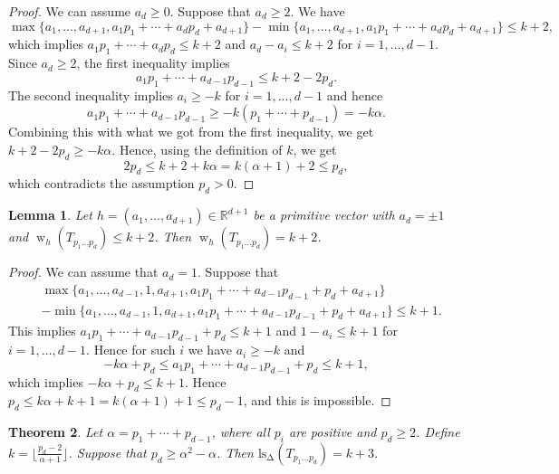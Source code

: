 \documentclass[11pt]{amsart}
\numberwithin{equation}{section}
\theoremstyle{plain}
\newtheorem{Theorem}{Theorem}[section]
\newtheorem{Lemma}[Theorem]{Lemma}
\theoremstyle{definition}
\newcommand{\R}{\mathbb R}
\newcommand{\w}{\operatorname{w}}
\newcommand{\ls}{\operatorname{ls_\Delta}}
\begin{document}
\begin{proof} We can assume $a_d\geq 0$. Suppose that $a_d\geq 2$. We have
$$\max\{a_1,\dots,a_{d+1},a_1p_1+\cdots +a_dp_d+a_{d+1}\}-\min\{a_1,\dots,a_{d+1},a_1p_1+\cdots +a_dp_d+a_{d+1}\}\leq k+2,
$$
which implies $a_1p_1+\cdots +a_dp_d\le k+2$
and $a_d-a_i\leq k+2$ for $i=1,\dots,d-1$.
Since $a_d\geq 2$, the first inequality  implies
$$a_1p_1+\cdots +a_{d-1}p_{d-1}\leq k+2-2p_d.
$$
The second inequality implies $a_i\geq -k$ for $i=1,\dots,d-1$ and  hence
$$a_1p_1+\cdots +a_{d-1}p_{d-1}\geq -k(p_1+\cdots+p_{d-1})=-k\alpha.
$$
Combining this with what we got from the first inequality, we get
$k+2-2p_d\geq -k\alpha.$
Hence, using the definition of $k$, we get
$$2p_d\leq k+2+k\alpha=k(\alpha+1)+2\leq p_d,
$$
  which contradicts the assumption $p_d>0$.
\end{proof}

\begin{Lemma}\label{L:Lemma2} Let $h=(a_1,\dots, a_{d+1})\in\R^{d+1}$ be a primitive vector with $a_d=\pm 1$ and  $\w_{h}(T_{p_1\dots p_d})\leq  k+2$.
Then $\w_{h}(T_{p_1\dots p_d})= k+2$.
\end{Lemma}

\begin{proof}
We can assume that $a_d=1$. Suppose that 
\begin{align*}
&\max\{a_1,\dots,a_{d-1},1, a_{d+1},a_1p_1+\cdots +a_{d-1}p_{d-1}+p_d+a_{d+1}\}\\
&-\min\{a_1,\dots,a_{d-1},1,a_{d+1},a_1p_1+\cdots +a_{d-1}p_{d-1}+p_d+a_{d+1}\}\leq k+1.
\end{align*}
This implies $a_1p_1+\cdots+a_{d-1}p_{d-1}+p_d\leq k+1$ and $1-a_i\leq k+1$ for $i=1,\dots, d-1$.
Hence for such $i$ we have $a_i\geq -k$ and
$$-k\alpha+p_d\leq a_1p_1+\cdots+a_{d-1}p_{d-1}+p_d\leq k+1,
$$
which implies $-k\alpha+p_d\leq k+1$.
Hence  $p_d\leq k\alpha+k+1=k(\alpha+1)+1\leq p_d-1$,
and this  is impossible.
\end{proof}

\begin{Theorem}\label{T:Main1} 
Let $\alpha=p_1+\cdots+p_{d-1}$, where all $p_i$ are positive and $p_d\geq 2$. Define $k=\lfloor\frac{p_d-2}{\alpha+1}\rfloor$.
Suppose that $p_d\geq \alpha^2-\alpha$. Then $\ls(T_{p_1\dots p_d})=k+3$.
\end{Theorem}
\end{document}

